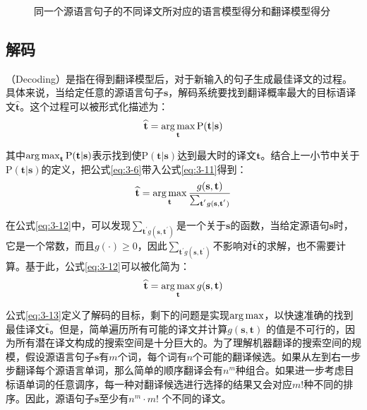 \begin{figure}[htp]
    \centering

    \caption{同一个源语言句子的不同译文所对应的语言模型得分和翻译模型得分}
    \label{fig:3-9}
\end{figure}



\subsection{解码}
\label{sec:simple-decoding}

（Decoding）是指在得到翻译模型后，对于新输入的句子生成最佳译文的过程。具体来说，当给定任意的源语言句子$\mathbf{s}$，解码系统要找到翻译概率最大的目标语译文$\hat{\mathbf{t}}$。这个过程可以被形式化描述为：
\begin{eqnarray}
\widehat{\mathbf{t}}=\operatorname*{arg\,max}_{\mathbf{t}} \textrm{P}(\mathbf{t}|\mathbf{s})
\label{eq:3-11}
\end{eqnarray}

\noindent  其中$\operatorname*{arg\,max}_{\mathbf{t}} \textrm{P}(\mathbf{t}|\mathbf{s})$表示找到使$\textrm{P}(\mathbf{t}|\mathbf{s})$达到最大时的译文$\mathbf{t}$。结合上一小节中关于$\textrm{P}(\mathbf{t}|\mathbf{s})$的定义，把公式\ref{eq:3-6}带入公式\ref{eq:3-11}得到：
\begin{eqnarray}
\widehat{\mathbf{t}}=\operatorname*{arg\,max}_{\mathbf{t}}\frac{g(\mathbf{s},\mathbf{t})}{\sum_{\mathbf{t}^{'}g(\mathbf{s},\mathbf{t}^{'})}}
\label{eq:3-12}
\end{eqnarray}

\parinterval 在公式\ref{eq:3-12}中，可以发现${\sum_{\mathbf{t}^{'}g(\mathbf{s},\mathbf{t}^{'})}}$是一个关于$\mathbf{s}$的函数，当给定源语句$\mathbf{s}$时，它是一个常数，而且$g(\cdot) \ge 0$，因此${\sum_{\mathbf{t}^{'}g(\mathbf{s},\mathbf{t}^{'})}}$不影响对$\widehat{\mathbf{t}}$的求解，也不需要计算。基于此，公式\ref{eq:3-12}可以被化简为：
\begin{eqnarray}
\widehat{\mathbf{t}}=\operatorname*{arg\,max}_{\mathbf{t}}g(\mathbf{s},\mathbf{t})
\label{eq:3-13}
\end{eqnarray}

\parinterval 公式\ref{eq:3-13}定义了解码的目标，剩下的问题是实现$\operatorname*{arg\,max}$，以快速准确的找到最佳译文$\widehat{\mathbf{t}}$。但是，简单遍历所有可能的译文并计算$g(\mathbf{s},\mathbf{t})$ 的值是不可行的，因为所有潜在译文构成的搜索空间是十分巨大的。为了理解机器翻译的搜索空间的规模，假设源语言句子$\mathbf{s}$有$m$个词，每个词有$n$个可能的翻译候选。如果从左到右一步步翻译每个源语言单词，那么简单的顺序翻译会有$n^m$种组合。如果进一步考虑目标语单词的任意调序，每一种对翻译候选进行选择的结果又会对应$m!$种不同的排序。因此，源语句子$\mathbf{s}$至少有$n^m \cdot m!$ 个不同的译文。

